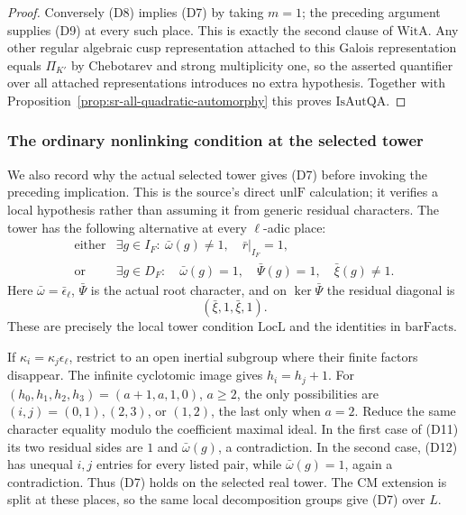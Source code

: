 \begin{proof}
Conversely (D8) implies (D7) by taking \(m=1\);
the preceding argument supplies (D9) at every such
place. This is exactly the second clause of
\(\mathrm{WitA}\).
Any other regular algebraic cusp representation
attached to this Galois representation equals
\(\Pi_{K'}\) by Chebotarev and strong multiplicity one,
so the asserted quantifier over all attached
representations introduces no extra hypothesis.
Together with
Proposition~\ref{prop:sr-all-quadratic-automorphy}
this proves \(\mathrm{IsAutQA}\).
\end{proof}

\subsubsection{The ordinary nonlinking condition at the selected tower}
We also record why the actual selected tower gives (D7)
before invoking the preceding implication.
This is the source's direct \(\mathrm{unlF}\) calculation;
it verifies a local hypothesis rather than assuming it
from generic residual characters.
The tower has the following alternative at every
\(\ell\)-adic place:
\[
 \begin{array}{ll}
 \text{either}&
 \exists g\in I_F:\ \bar\omega(g)\ne1,
                         \quad\bar r|_{I_F}=1,\\
 \text{or}&
 \exists g\in D_F:\quad
      \bar\omega(g)=1,\quad\bar\Psi(g)=1,\quad
                                     \bar\xi(g)\ne1 .
 \end{array}
 \tag{D11}
\]
Here \(\bar\omega=\bar\epsilon_\ell\),
\(\bar\Psi\) is the actual root character, and on
\(\ker\bar\Psi\) the residual diagonal is
\[
                      (\bar\xi,1,\bar\xi,1).
 \tag{D12}
\]
These are precisely the local tower condition
\(\mathrm{LocL}\) and the identities in
\(\mathrm{barFacts}\).

If \(\kappa_i=\kappa_j\epsilon_\ell\), restrict to an
open inertial subgroup where their finite factors
disappear.
The infinite cyclotomic image gives
\(h_i=h_j+1\).
For \((h_0,h_1,h_2,h_3)=(a+1,a,1,0)\), \(a\ge2\),
the only possibilities are
\((i,j)=(0,1),(2,3)\), or \((1,2)\), the last only
when \(a=2\).
Reduce the same character equality modulo the
coefficient maximal ideal.
In the first case of (D11) its two residual sides
are \(1\) and \(\bar\omega(g)\), a contradiction.
In the second case, (D12) has unequal \(i,j\)
entries for every listed pair, while
\(\bar\omega(g)=1\), again a contradiction.
Thus (D7) holds on the selected real tower.
The CM extension is split at these places, so the
same local decomposition groups give (D7) over \(L\).

